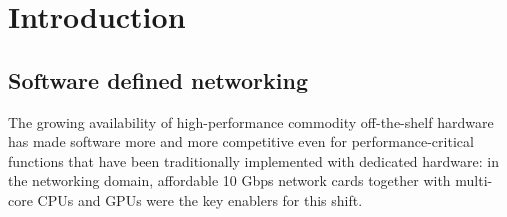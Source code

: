 \documentclass[12pt,a4paper,twoside]{book}
\begin{document}






\chapter{Introduction}


\section{Software defined networking}
The growing availability of high-performance commodity off-the-shelf %
hardware has made software more and more competitive even for performance-critical functions that have been traditionally implemented with dedicated hardware: in the networking domain, affordable 10 Gbps network cards together with multi-core CPUs and GPUs were the key enablers for this shift.
\end{document}
